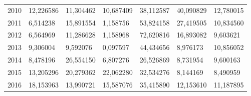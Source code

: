 \begin{table}
\begin{tabular}{p{1cm}p{2cm}p{2cm}p{2cm}p{2cm}p{2cm}p{2cm}}
 2010 &       12,226586 &                11,304462 &        10,687409 &                                    38,112587 &              40,090829 &                    12,780015 \\
 2011 &        6,514238 &                15,891554 &         1,158756 &                                    53,824158 &              27,419505 &                    10,834560 \\
 2012 &        6,564969 &                11,286628 &         1,158968 &                                    72,620816 &              16,893082 &                     9,603621 \\
 2013 &        9,306004 &                 9,592076 &         0,097597 &                                    44,434656 &               8,976173 &                    10,856052 \\
 2014 &        8,478196 &                26,554150 &         6,807276 &                                    26,526869 &               8,731954 &                     9,600163 \\
 2015 &       13,205296 &                20,279362 &        22,062280 &                                    32,534276 &               8,144169 &                     8,490959 \\
 2016 &       18,153963 &                13,990721 &        15,587076 &                                    35,415890 &              12,153610 &                    11,187895 \\
\bottomrule
\end{tabular}
\end{table}
